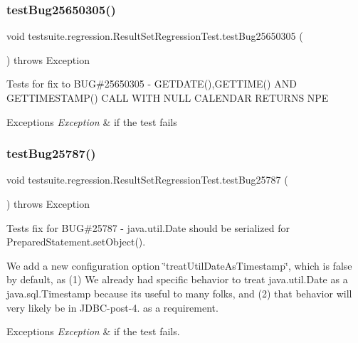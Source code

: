 \subsubsection{\texorpdfstring{test\+Bug25650305()}{testBug25650305()}}
{\footnotesize\ttfamily void testsuite.\+regression.\+Result\+Set\+Regression\+Test.\+test\+Bug25650305 (\begin{DoxyParamCaption}{ }\end{DoxyParamCaption}) throws Exception}

Tests for fix to B\+UG\#25650305 -\/ G\+E\+T\+D\+A\+T\+E(),G\+E\+T\+T\+I\+M\+E() A\+ND G\+E\+T\+T\+I\+M\+E\+S\+T\+A\+M\+P() C\+A\+LL W\+I\+TH N\+U\+LL C\+A\+L\+E\+N\+D\+AR R\+E\+T\+U\+R\+NS N\+PE


\begin{DoxyExceptions}{Exceptions}
{\em Exception} & if the test fails \\
\hline
\end{DoxyExceptions}
\mbox{\label{classtestsuite_1_1regression_1_1_result_set_regression_test_ac301a606f76010d277f5daf49e296b01}} 
\subsubsection{\texorpdfstring{test\+Bug25787()}{testBug25787()}}
{\footnotesize\ttfamily void testsuite.\+regression.\+Result\+Set\+Regression\+Test.\+test\+Bug25787 (\begin{DoxyParamCaption}{ }\end{DoxyParamCaption}) throws Exception}

Tests fix for B\+UG\#25787 -\/ java.\+util.\+Date should be serialized for Prepared\+Statement.\+set\+Object().

We add a new configuration option \char`\"{}treat\+Util\+Date\+As\+Timestamp\char`\"{}, which is false by default, as (1) We already had specific behavior to treat java.\+util.\+Date as a java.\+sql.\+Timestamp because it\textquotesingle{}s useful to many folks, and (2) that behavior will very likely be in J\+D\+B\+C-\/post-\/4. as a requirement.


\begin{DoxyExceptions}{Exceptions}
{\em Exception} & if the test fails. \\
\hline
\end{DoxyExceptions}
\mbox{\label{classtestsuite_1_1regression_1_1_result_set_regression_test_ae96bf431292ca3dc0ee61559038d7cf0}} 
